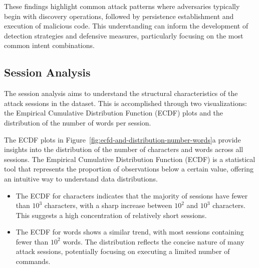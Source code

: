         These findings highlight common attack patterns where adversaries typically begin with discovery operations, followed by persistence establishment and execution of malicious code. This understanding can inform the development of detection strategies and defensive measures, particularly focusing on the most common intent combinations.
        
    \subsection{Session Analysis}

        The session analysis aims to understand the structural characteristics of the attack sessions in the dataset. This is accomplished through two visualizations: the Empirical Cumulative Distribution Function (ECDF) plots and the distribution of the number of words per session.

        The ECDF plots in Figure~\ref{fig:ecfd-and-distribution-number-words}a provide insights into the distribution of the number of characters and words across all sessions. The Empirical Cumulative Distribution Function (ECDF) is a statistical tool that represents the proportion of observations below a certain value, offering an intuitive way to understand data distributions.
        
        \begin{itemize}
        
            \item The ECDF for characters indicates that the majority of sessions have fewer than $10^3$ characters, with a sharp increase between $10^2$ and $10^3$ characters. This suggests a high concentration of relatively short sessions.
            
            \item The ECDF for words shows a similar trend, with most sessions containing fewer than $10^2$ words. The distribution reflects the concise nature of many attack sessions, potentially focusing on executing a limited number of commands.
            
        \end{itemize}
        
